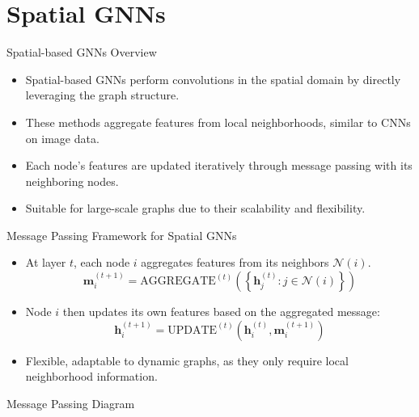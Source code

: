 \section{Spatial GNNs}


\begin{frame}{Spatial-based GNNs Overview}
    \begin{itemize}
        \item Spatial-based GNNs perform convolutions in the spatial domain by directly leveraging the graph structure.
        \item These methods aggregate features from local neighborhoods, similar to CNNs on image data.
        \item Each node's features are updated iteratively through message passing with its neighboring nodes.
        \item Suitable for large-scale graphs due to their scalability and flexibility.
    \end{itemize}
\end{frame}

\begin{frame}{Message Passing Framework for Spatial GNNs}
    \begin{itemize}
        \item At layer \( t \), each node \( i \) aggregates features from its neighbors \( \mathcal{N}(i) \).
        \[
        \mathbf{m}_i^{(t+1)} = \text{AGGREGATE}^{(t)} \left( \left\{ \mathbf{h}_j^{(t)} : j \in \mathcal{N}(i) \right\} \right)
        \]
        \item Node \( i \) then updates its own features based on the aggregated message:
        \[
        \mathbf{h}_i^{(t+1)} = \text{UPDATE}^{(t)} \left( \mathbf{h}_i^{(t)}, \mathbf{m}_i^{(t+1)} \right)
        \]
        \item Flexible, adaptable to dynamic graphs, as they only require local neighborhood information.
    \end{itemize}
\end{frame}

\begin{frame}{Message Passing Diagram}

    

\end{frame}


